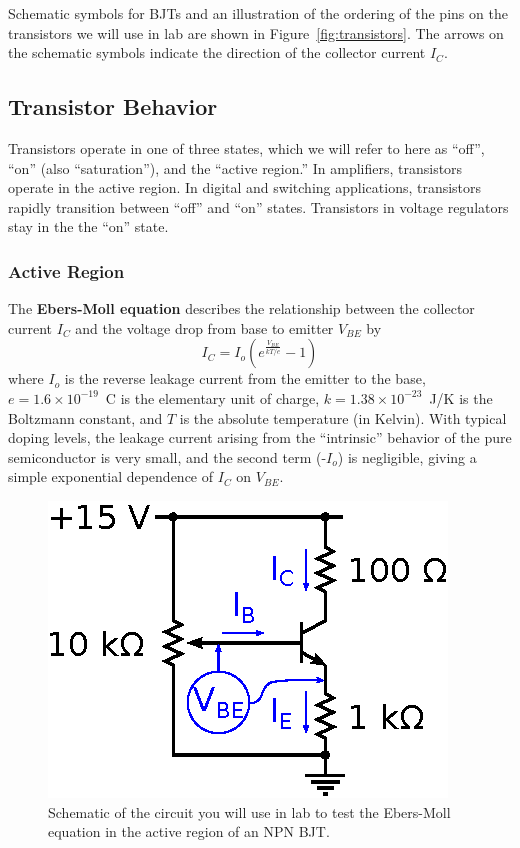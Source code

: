 \documentclass[11pt]{article}
\begin{document}
Schematic symbols for BJTs and an illustration of the ordering of the
pins on the transistors we will use in lab are shown in
Figure~\ref{fig:transistors}. The arrows on the schematic symbols
indicate the direction of the collector current $I_C$.

\subsection{Transistor Behavior}

Transistors operate in one of three states, which we will refer to
here as ``off'', ``on'' (also ``saturation''), and the ``active
region.'' In amplifiers, transistors operate in the active region. In
digital and switching applications, transistors rapidly transition
between ``off'' and ``on'' states. Transistors in voltage regulators
stay in the the ``on'' state.

\subsubsection*{Active Region}

The \textbf{Ebers-Moll equation} describes the relationship between
the collector current $I_C$ and the voltage drop from base to emitter
$V_{BE}$ by
\begin{equation}
  I_C = I_o \left( e^{\frac{V_{BE}}{kT/e}} - 1 \right)
  \label{eq:ebersmoll}
\end{equation}
where $I_o$ is the reverse leakage current from the emitter to the
base, $e = 1.6 \times 10^{-19}$~C is the elementary unit of charge, $k
= 1.38 \times 10^{-23}$~J/K is the Boltzmann constant, and $T$ is the
absolute temperature (in Kelvin). With typical doping levels, the
leakage current arising from the ``intrinsic'' behavior of the pure
semiconductor is very small, and the second term (-$I_o$) is
negligible, giving a simple exponential dependence of $I_C$ on
$V_{BE}$.

\begin{figure}[ht]
  \begin{center}
    \includegraphics{ebersmollcircuit.eps}
    \caption{Schematic of the circuit you will use in lab to test the
      Ebers-Moll equation in the active region of an NPN BJT.}
    \label{fig:ebersmollcircuit}
  \end{center}
\end{figure}
\end{document}

